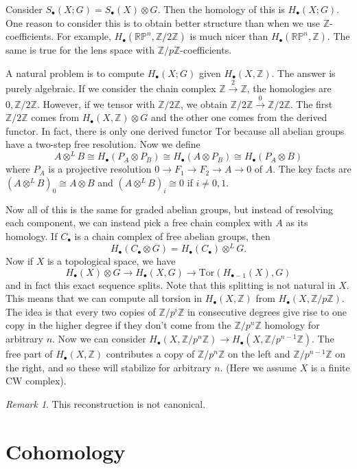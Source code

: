 \documentclass[leqno, openany]{memoir}
\theoremstyle{definition}
\theoremstyle{remark}
\newtheorem{rmk}[thm]{Remark}
\theoremstyle{plain}
\theoremstyle{definition}
\theoremstyle{remark}
\newcommand{\R}{\mathbb{R}}
\newcommand{\Z}{\mathbb{Z}}
\renewcommand{\P}{\mathbb{P}}
\newcommand{\mr}[1]{\mathrm{#1}}
\begin{document}
Consider $S_{\bullet}(X;G) = S_{\bullet}(X) \otimes G$. Then the homology of this is $H_{\bullet}(X;G)$. One reason to consider this is to obtain better structure than when we use $\Z$-coefficients. For example, $H_{\bullet}(\R\P^n, \Z/2\Z)$ is much nicer than $H_{\bullet}(\R\P^n, \Z)$. The same is true for the lens space with $\Z/p\Z$-coefficients.

A natural problem is to compute $H_{\bullet}(X;G)$ given $H_{\bullet}(X,\Z)$. The answer is purely algebraic. If we consider the chain complex $\Z \xrightarrow{2} \Z$, the homologies are $0, \Z/2\Z$. However, if we tensor with $\Z/2\Z$, we obtain $\Z/2\Z \xrightarrow{0} \Z/2\Z$. The first $\Z/2\Z$ comes from $H_{\bullet}(X, \Z) \otimes G$ and the other one comes from the derived functor. In fact, there is only one derived functor $\mr{Tor}$ because all abelian groups have a two-step free resolution. Now we define
\[ A \otimes^L B \cong H_{\bullet}(P_A \otimes P_B) \cong H_{\bullet}(A \otimes P_B) \cong H_{\bullet}(P_A \otimes B) \]
where $P_A$ is a projective resolution $0 \to F_1 \to F_2 \to A \to 0$ of $A$. The key facts are $(A \otimes^L B)_0 \cong A \otimes B$ and $(A \otimes^L B)_i \cong 0$ if $i \neq 0,1$.

Now all of this is the same for graded abelian groups, but instead of resolving each component, we can instead pick a free chain complex with $A$ as its homology. If $C_{\bullet}$ is a chain complex of free abelian groups, then 
\[ H_{\bullet}(C_{\bullet} \otimes G) = H_{\bullet}(C_{\bullet}) \otimes^L G. \] 
Now if $X$ is a topological space, we have
\[ H_{\bullet}(X) \otimes G \to H_{\bullet}(X, G) \to \mr{Tor}(H_{\bullet - 1}(X), G) \]
and in fact this exact sequence splits. Note that this splitting is not natural in $X$. This means that we can compute all torsion in $H_{\bullet}(X, \Z)$ from $H_{\bullet}(X, \Z/p\Z)$. The idea is that every two copies of $\Z/p^i\Z$ in consecutive degrees give rise to one copy in the higher degree if they don't come from the $\Z/p^n\Z$ homology for arbitrary $n$. Now we can consider $H_{\bullet}(X, \Z/p^n\Z) \to H_{\bullet}(X, \Z/p^{n-1}\Z)$. The free part of $H_{\bullet}(X, \Z)$ contributes a copy of $\Z/p^n\Z$ on the left and $\Z/p^{n-1}\Z$ on the right, and so these will stabilize for arbitrary $n$. (Here we assume $X$ is a finite CW complex). 

\begin{rmk}
    This reconstruction is not canonical.
\end{rmk}

\chapter{Cohomology}%
\label{cha:cohomology}
\end{document}
